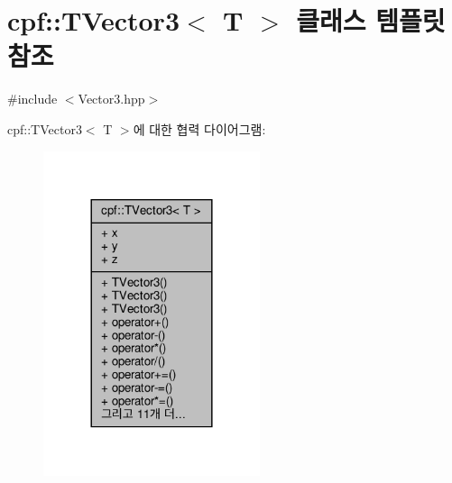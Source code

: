 \hypertarget{classcpf_1_1_t_vector3}{}\section{cpf\+:\+:T\+Vector3$<$ T $>$ 클래스 템플릿 참조}
\label{classcpf_1_1_t_vector3}


{\ttfamily \#include $<$Vector3.\+hpp$>$}



cpf\+:\+:T\+Vector3$<$ T $>$에 대한 협력 다이어그램\+:
\nopagebreak
\begin{figure}[H]
\begin{center}
\leavevmode
\includegraphics[width=180pt]{classcpf_1_1_t_vector3__coll__graph}
\end{center}
\end{figure}
